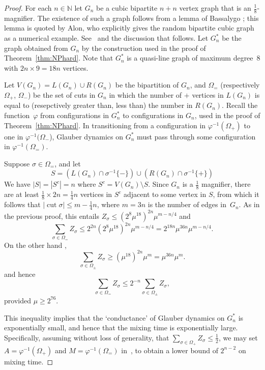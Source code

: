 \documentclass[11pt]{amsart}
\newcommand{\cut}{\mathop{\mathrm{cut}}}
\newcommand{\Nset}{\mathbb{N}}
\let\phi=\varphi
\begin{document}
\begin{proof}
For each $n\in\Nset$ let $G_n$ be a cubic bipartite $n+n$ vertex graph that is an $\frac18$-magnifier.  The existence of such a graph follows from a lemma of Bassalygo \cite{Bassalygo}; this lemma is quoted by Alon, who explicitly gives the random bipartite cubic graph as a numerical example. See~\cite[Lemma 4.1]{Alon} and the discussion that follows.   Let $G_n^*$ be the graph obtained from $G_n$ by the construction used in the proof of Theorem~\ref{thm:NPhard}.  Note that $G_n^*$ is a quasi-line graph of maximum degree~8 with $2n\times9=18n$ vertices.  

Let $V(G_n)=L(G_n)\cup R(G_n)$ be the bipartition of $G_n$, and $\Omega_=$ (respectively $\Omega_+$, $\Omega_-$) be the set of cuts in $G_n$ in which the number of $+$ vertices in $L(G_n)$ is equal to (resepctively greater than, less than) the number  in $R(G_n)$.  Recall the function~$\phi$ from configurations in $G_n^*$ to configurations in $G_n$, used in the proof of Theorem~\ref{thm:NPhard}.  In transitioning from a configuration in $\phi^{-1}(\Omega_+)$ to one in $\phi^{-1}(\Omega_-$), Glauber dynamics on $G_n^*$ must pass through some configuration in $\phi^{-1}(\Omega_=)$.     

Suppose $\sigma\in\Omega_=$, and let 
$$S=(L(G_n)\cap \sigma^{-1}\{-\})\cup (R(G_n)\cap \sigma^{-1}\{+\})$$
We have $|S|=|S^c|=n$ where $S^c=V(G_n)\setminus S$.  Since $G_n$ is a $\frac18$ magnifier, there are at least $\frac18\times2n=\frac14n$ vertices in $S^c$ adjacent to some vertex in $S$, from which it follows that  $|\cut \sigma|\leq m-\frac14n$, where $m=3n$ is the number of edges in~$G_n$.  As in the previous proof, this entails $Z_\sigma\leq (2^8\mu^{18})^{2n}\mu^{m-n/4}$ and 
$$
\sum_{\sigma\in\Omega_=}Z_\sigma\leq 2^{2n}(2^8\mu^{18})^{2n}\mu^{m-n/4}=2^{18n}\mu^{36n}\mu^{m-n/4}.
$$
On the other hand ,
$$
\sum_{\sigma\in\Omega_\pm} Z_\sigma\geq (\mu^{18})^{2n}\mu^m=\mu^{36n}\mu^m.
$$
and hence
$$
\sum_{\sigma\in\Omega_=}Z_\sigma\leq 2^{-n}\sum_{\sigma\in\Omega_\pm}Z_\sigma,
$$
provided $\mu\geq2^{76}$.

This inequality implies that the `conductance' of Glauber dynamics on $G^*_n$ is exponentially small, and hence that the mixing time is exponentially large.  Specifically, assuming without loss of generality, that $\sum_{\sigma\in\Omega_+}Z_\sigma\leq\frac12$, we may set $A=\phi^{-1}(\Omega_+)$ and $M=\phi^{-1}(\Omega_=)$ in~\cite[Claim 7.14]{ETH}, to obtain a lower bound of $2^{n-2}$ on mixing time. 
\end{proof}
\end{document}
